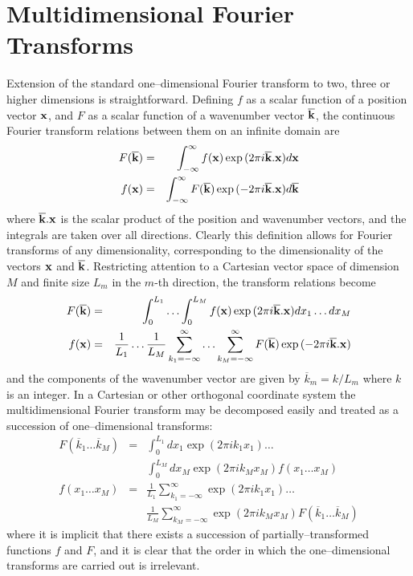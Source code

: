 \documentclass[dvips]{article}
\begin{document}
\section*{Multidimensional Fourier Transforms}
Extension of the standard one--dimensional Fourier transform to two, three or
higher dimensions is straightforward.  Defining $f$ as a scalar
function of a position vector ${\bf x}$, and $F$ as a scalar function of
a wavenumber vector ${\bf\overline{k}}$, the continuous Fourier transform
relations between them on an infinite domain are
\begin{eqnarray}
F({\bf \overline{k}}) & = &
\int_{-\infty}^{\infty} f({\bf x})
\exp{(2\pi i {\bf \overline{k}}.{\bf x})} d{\bf x} \\
f({\bf x}) & = & \int_{-\infty}^{\infty} F({\bf\overline{k}}) \exp{(-2\pi i
{\bf\overline{k}}.{\bf x})} d{\bf\overline{k}}
\end{eqnarray}
where ${\bf\overline{k}}.{\bf x}$ is the scalar product of the position
and wavenumber vectors, and the integrals are taken over all directions.
Clearly this definition allows
for Fourier transforms of any dimensionality, corresponding to the
dimensionality of the vectors ${\bf x}$ and ${\bf\overline{k}}$.
Restricting attention to a Cartesian vector space of dimension $M$ and 
finite size $L_{m}$ in the $m$-th direction, the transform relations become
\begin{eqnarray}
F({\bf\overline{k}}) & = & \int_{0}^{L_{1}}\ldots\int_{0}^{L_{M}}
f({\bf x}) \exp{(2\pi i {\bf \overline{k}}.{\bf x})} dx_{1}\ldots dx_{M} \\
f({\bf x}) & = & \frac{1}{L_{1}}\ldots\frac{1}{L_{M}}
\sum_{k_{1}=-\infty}^{\infty}\ldots\sum_{k_{M}=-\infty}^{\infty}
F({\bf \overline{k}}) \exp{(-2\pi i {\bf\overline{k}}.{\bf x})} 
\end{eqnarray}
and the components of the wavenumber vector are given by
$\overline{k}_{m} = k/L_{m}$ where $k$ is an integer.  In a Cartesian or
other orthogonal coordinate system the multidimensional Fourier
transform may be decomposed easily and treated as a succession
of one--dimensional transforms:
\begin{eqnarray}
F(\overline{k}_{1}\ldots\overline{k}_{M}) & = & 
\int_{0}^{L_{1}}dx_{1}\exp{(2\pi i k_{1}x_{1})}\ldots
\nonumber \\ & &
\int_{0}^{L_{M}}dx_{M}\exp{(2\pi i k_{M}x_{M})}
f(x_{1}\ldots x_{M}) \\
f(x_{1}\ldots x_{M}) & = & 
\frac{1}{L_{1}}\sum_{k_{1}=-\infty}^{\infty}\exp{(2\pi i k_{1}x_{1})}\ldots
\nonumber \\ & &
\frac{1}{L_{M}}\sum_{k_{M}=-\infty}^{\infty}\exp{(2\pi i k_{M}x_{M})}
F(\overline{k}_{1}\ldots\overline{k}_{M})
\end{eqnarray}
where it is implicit that there exists a succession of
partially--transformed functions $f$ and $F$, and it is clear that the
order in which the one--dimensional transforms are carried out is
irrelevant.
\end{document}
